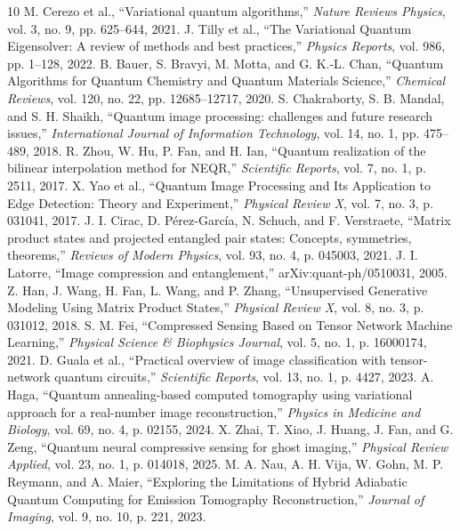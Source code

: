 \documentclass[journal]{IEEEtran}
\begin{document}
\begin{thebibliography}{10}
 M. Cerezo et al., ``Variational quantum algorithms,'' \textit{Nature Reviews Physics}, vol. 3, no. 9, pp. 625--644, 2021.
 J. Tilly et al., ``The Variational Quantum Eigensolver: A review of methods and best practices,'' \textit{Physics Reports}, vol. 986, pp. 1--128, 2022.
 B. Bauer, S. Bravyi, M. Motta, and G. K.-L. Chan, ``Quantum Algorithms for Quantum Chemistry and Quantum Materials Science,'' \textit{Chemical Reviews}, vol. 120, no. 22, pp. 12685--12717, 2020.
 S. Chakraborty, S. B. Mandal, and S. H. Shaikh, ``Quantum image processing: challenges and future research issues,'' \textit{International Journal of Information Technology}, vol. 14, no. 1, pp. 475--489, 2018.
 R. Zhou, W. Hu, P. Fan, and H. Ian, ``Quantum realization of the bilinear interpolation method for NEQR,'' \textit{Scientific Reports}, vol. 7, no. 1, p. 2511, 2017.
 X. Yao et al., ``Quantum Image Processing and Its Application to Edge Detection: Theory and Experiment,'' \textit{Physical Review X}, vol. 7, no. 3, p. 031041, 2017.
 J. I. Cirac, D. Pérez-García, N. Schuch, and F. Verstraete, ``Matrix product states and projected entangled pair states: Concepts, symmetries, theorems,'' \textit{Reviews of Modern Physics}, vol. 93, no. 4, p. 045003, 2021.
 J. I. Latorre, ``Image compression and entanglement,'' arXiv:quant-ph/0510031, 2005.
 Z. Han, J. Wang, H. Fan, L. Wang, and P. Zhang, ``Unsupervised Generative Modeling Using Matrix Product States,'' \textit{Physical Review X}, vol. 8, no. 3, p. 031012, 2018.
 S. M. Fei, ``Compressed Sensing Based on Tensor Network Machine Learning,'' \textit{Physical Science \& Biophysics Journal}, vol. 5, no. 1, p. 16000174, 2021.
 D. Guala et al., ``Practical overview of image classification with tensor-network quantum circuits,'' \textit{Scientific Reports}, vol. 13, no. 1, p. 4427, 2023.
 A. Haga, ``Quantum annealing-based computed tomography using variational approach for a real-number image reconstruction,'' \textit{Physics in Medicine and Biology}, vol. 69, no. 4, p. 02155, 2024.
 X. Zhai, T. Xiao, J. Huang, J. Fan, and G. Zeng, ``Quantum neural compressive sensing for ghost imaging,'' \textit{Physical Review Applied}, vol. 23, no. 1, p. 014018, 2025.
 M. A. Nau, A. H. Vija, W. Gohn, M. P. Reymann, and A. Maier, ``Exploring the Limitations of Hybrid Adiabatic Quantum Computing for Emission Tomography Reconstruction,'' \textit{Journal of Imaging}, vol. 9, no. 10, p. 221, 2023.

\end{thebibliography}
\end{document}
